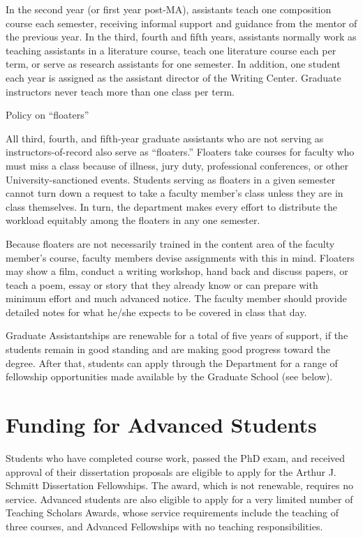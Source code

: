 \documentclass[letterpaper,10pt,english]{sphinxmanual}
\begin{document}
In the second year (or first year post-MA), assistants teach one composition course each semester, receiving informal support and guidance from the mentor of the previous year. In the third, fourth and fifth years, assistants normally work as teaching assistants in a literature course, teach one literature course each per term, or serve as research assistants for one semester. In addition, one student each year is assigned as the assistant director of the Writing Center. Graduate instructors never teach more than one class per term.

Policy on “floaters”

All third, fourth, and fifth-year graduate assistants who are not serving as instructors-of-record also serve as “floaters.” Floaters take courses for faculty who must miss a class because of illness, jury duty, professional conferences, or other University-sanctioned events. Students serving as floaters in a given semester cannot turn down a request to take a faculty member’s class unless they are in class themselves. In turn, the department makes every effort to distribute the workload equitably among the floaters in any one semester.

Because floaters are not necessarily trained in the content area of the faculty member’s course, faculty members devise assignments with this in mind. Floaters may show a film, conduct a writing workshop, hand back and discuss papers, or teach a poem, essay or story that they already know or can prepare with minimum effort and much advanced notice. The faculty member should provide detailed notes for what he/she expects to be covered in class that day.

Graduate Assistantships are renewable for a total of five years of support, if the students remain in good standing and are making good progress toward the degree. After that, students can apply through the Department for a range of fellowship opportunities made available by the Graduate School (see below).


\section{Funding for Advanced Students}
\label{assistantships:funding-for-advanced-students}
Students who have completed course work, passed the PhD exam, and received approval of their dissertation proposals are eligible to apply for the Arthur J. Schmitt Dissertation Fellowships. The award, which is not renewable, requires no service. Advanced students are also eligible to apply for a very limited number of Teaching Scholars Awards, whose service requirements include the teaching of three courses, and Advanced Fellowships with no teaching responsibilities.
\end{document}
